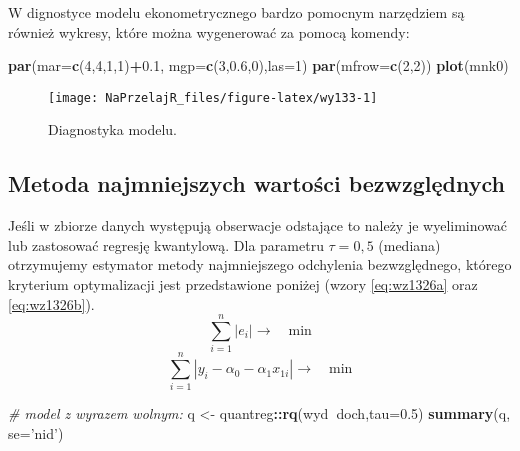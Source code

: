 \documentclass[polish,]{book}
\newenvironment{Shaded}{\begin{snugshade}}{\end{snugshade}}
\newcommand{\CommentTok}[1]{\textcolor[rgb]{0.56,0.35,0.01}{\textit{#1}}}
\newcommand{\DataTypeTok}[1]{\textcolor[rgb]{0.13,0.29,0.53}{#1}}
\newcommand{\DecValTok}[1]{\textcolor[rgb]{0.00,0.00,0.81}{#1}}
\newcommand{\FloatTok}[1]{\textcolor[rgb]{0.00,0.00,0.81}{#1}}
\newcommand{\KeywordTok}[1]{\textcolor[rgb]{0.13,0.29,0.53}{\textbf{#1}}}
\newcommand{\NormalTok}[1]{#1}
\newcommand{\OperatorTok}[1]{\textcolor[rgb]{0.81,0.36,0.00}{\textbf{#1}}}
\newcommand{\StringTok}[1]{\textcolor[rgb]{0.31,0.60,0.02}{#1}}
\begin{document}
W dignostyce modelu ekonometrycznego bardzo pomocnym narzędziem są również
wykresy, które można wygenerować za pomocą komendy:

\begin{Shaded}
\begin{Highlighting}[]
\KeywordTok{par}\NormalTok{(}\DataTypeTok{mar=}\KeywordTok{c}\NormalTok{(}\DecValTok{4}\NormalTok{,}\DecValTok{4}\NormalTok{,}\DecValTok{1}\NormalTok{,}\DecValTok{1}\NormalTok{)}\OperatorTok{+}\FloatTok{0.1}\NormalTok{, }\DataTypeTok{mgp=}\KeywordTok{c}\NormalTok{(}\DecValTok{3}\NormalTok{,}\FloatTok{0.6}\NormalTok{,}\DecValTok{0}\NormalTok{),}\DataTypeTok{las=}\DecValTok{1}\NormalTok{)}
\KeywordTok{par}\NormalTok{(}\DataTypeTok{mfrow=}\KeywordTok{c}\NormalTok{(}\DecValTok{2}\NormalTok{,}\DecValTok{2}\NormalTok{))}
\KeywordTok{plot}\NormalTok{(mnk0)}
\end{Highlighting}
\end{Shaded}

\begin{figure}[h]

{\centering \texttt{[image: NaPrzelajR\_files/figure-latex/wy133-1]} 

}

\caption{Diagnostyka modelu.}\label{fig:wy133}
\end{figure}

\hypertarget{part_13.2.6}{%
\subsection{Metoda najmniejszych wartości bezwzględnych}\label{part_13.2.6}}

Jeśli w zbiorze danych występują obserwacje odstające to należy je wyeliminować
lub zastosować regresję kwantylową. Dla parametru \(\tau = 0,5\) (mediana) otrzymujemy estymator metody najmniejszego odchylenia bezwzględnego, którego kryterium optymalizacji jest przedstawione poniżej (wzory \eqref{eq:wz1326a} oraz \eqref{eq:wz1326b}).
\begin{equation}
\sum_{i=1}^{n}|e_i| \longrightarrow\quad\mbox{min}
\label{eq:wz1326a}
\end{equation}
\begin{equation}
\sum_{i=1}^{n}|y_i-\alpha_0-\alpha_1x_{1i}| \longrightarrow\quad\mbox{min}
\label{eq:wz1326b}
\end{equation}

\begin{Shaded}
\begin{Highlighting}[]
\CommentTok{# model z wyrazem wolnym:}
\NormalTok{q <-}\StringTok{ }\NormalTok{quantreg}\OperatorTok{::}\KeywordTok{rq}\NormalTok{(wyd}\OperatorTok{~}\NormalTok{doch,}\DataTypeTok{tau=}\FloatTok{0.5}\NormalTok{)}
\KeywordTok{summary}\NormalTok{(q, }\DataTypeTok{se=}\StringTok{'nid'}\NormalTok{)}
\end{Highlighting}
\end{Shaded}
\end{document}
